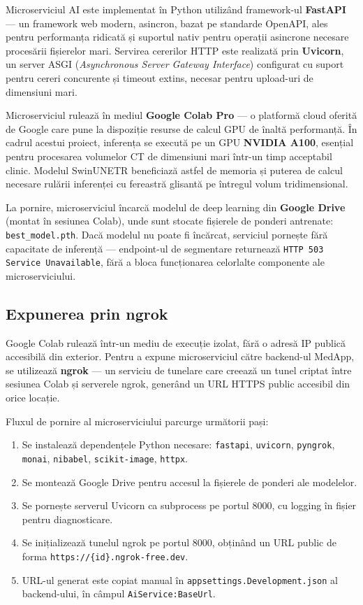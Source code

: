 \documentclass[12pt, a4paper]{report}
\begin{document}
Microserviciul AI este implementat în Python utilizând framework-ul \textbf{FastAPI} ---
un framework web modern, asincron, bazat pe standarde OpenAPI, ales pentru performanța
ridicată și suportul nativ pentru operații asincrone necesare procesării fișierelor mari.
Servirea cererilor HTTP este realizată prin \textbf{Uvicorn}, un server ASGI
(\textit{Asynchronous Server Gateway Interface}) configurat cu suport pentru cereri
concurente și timeout extins, necesar pentru upload-uri de dimensiuni mari.


Microserviciul rulează în mediul \textbf{Google Colab Pro} --- o platformă cloud oferită
de Google care pune la dispoziție resurse de calcul GPU de înaltă performanță. În cadrul
acestui proiect, inferența se execută pe un GPU \textbf{NVIDIA A100}, esențial pentru
procesarea volumelor CT de dimensiuni mari într-un timp acceptabil clinic. Modelul
SwinUNETR beneficiază astfel de memoria și puterea de calcul necesare rulării inferenței
cu fereastră glisantă pe întregul volum tridimensional.


La pornire, microserviciul încarcă modelul de deep learning din \textbf{Google Drive}
(montat în sesiunea Colab), unde sunt stocate fișierele de ponderi antrenate:
\texttt{best\_model.pth}. Dacă modelul nu poate fi încărcat, serviciul pornește fără
capacitate de inferență --- endpoint-ul de segmentare returnează \texttt{HTTP 503
Service Unavailable}, fără a bloca funcționarea celorlalte componente ale microserviciului.


\subsection{Expunerea prin ngrok}

Google Colab rulează într-un mediu de execuție izolat, fără o adresă IP publică
accesibilă din exterior. Pentru a expune microserviciul către backend-ul MedApp,
se utilizează \textbf{ngrok} --- un serviciu de tunelare care creează un tunel
criptat între sesiunea Colab și serverele ngrok, generând un URL HTTPS public
accesibil din orice locație.

Fluxul de pornire al microserviciului parcurge următorii pași:

\begin{enumerate}
    \item Se instalează dependențele Python necesare: \texttt{fastapi},
          \texttt{uvicorn}, \texttt{pyngrok}, \texttt{monai}, \texttt{nibabel},
          \texttt{scikit-image}, \texttt{httpx}.
    \item Se montează Google Drive pentru accesul la fișierele de ponderi ale
          modelelor.
    \item Se pornește serverul Uvicorn ca subprocess pe portul 8000, cu logging
          în fișier pentru diagnosticare.
    \item Se inițializează tunelul ngrok pe portul 8000, obținând un URL public
          de forma \texttt{https://\{id\}.ngrok-free.dev}.
    \item URL-ul generat este copiat manual în \texttt{appsettings.Development.json}
          al backend-ului, în câmpul \texttt{AiService:BaseUrl}.
\end{enumerate}
\end{document}
